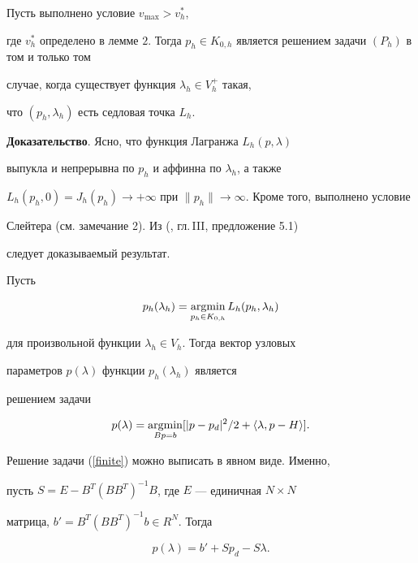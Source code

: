 \begin{thm}


Пусть выполнено условие $v_{\max}>v_h^{*}$,


где $v_h^{*}$ определено в лемме $2$. Тогда $p_h \in


K_{0,h}$ является решением задачи $(P_h)$ в том и только том


случае, когда существует функция $\lambda_h \in V_h^{+}$ такая,


что $(p_h,\lambda_h)$ есть седловая точка $L_h$.


\end{thm}





{\bf Доказательство}. Ясно, что функция Лагранжа $L_h(p,\lambda)$


выпукла и непрерывна по $p_h$ и аффинна по $\lambda_h$, а также


$L_h(p_h,0)=J_h(p_h)\to +\infty$ при $\|


p_h\|\to \infty$. Кроме того, выполнено условие


Слейтера (см. замечание 2). Из (\cite{Ekland}, гл.\,III, предложение 5.1)


следует доказываемый результат.





Пусть


$$


p_h(\lambda_h)=\argmin\limits_{p_h\in K_{0,h}} L_h(p_h,\lambda_h)


$$


для произвольной функции $\lambda_h\in V_h$. Тогда вектор узловых


параметров $p(\lambda)$ функции $ p_h(\lambda_h)$ является


решением задачи


\begin{equation}\label{finite}


p(\lambda)=\argmin\limits_{Bp=b}[|p-p_{d}|^2/2+\langle\lambda,


p-H\rangle].


\end{equation}


Решение задачи (\ref{finite}) можно выписать в явном виде. Именно,


пусть $S=E-B^T(BB^T)^{-1}B$, где $E$ --- единичная $N\times N$


матрица, $b'=B^T(BB^T)^{-1} b\in R^N$. Тогда


\begin{equation}\label{solution}


p(\lambda)=b'+Sp_d-S\lambda.


\end{equation}


